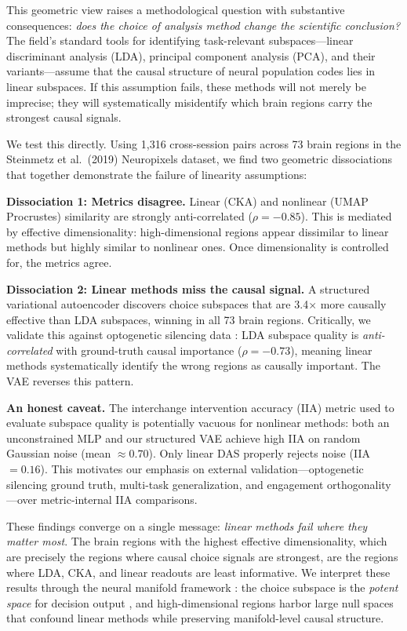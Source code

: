 \documentclass{article}
\begin{document}
This geometric view raises a methodological question with substantive consequences: \emph{does the choice of analysis method change the scientific conclusion?} The field's standard tools for identifying task-relevant subspaces---linear discriminant analysis (LDA), principal component analysis (PCA), and their variants---assume that the causal structure of neural population codes lies in linear subspaces. If this assumption fails, these methods will not merely be imprecise; they will systematically misidentify which brain regions carry the strongest causal signals.

We test this directly. Using 1,316 cross-session pairs across 73 brain regions in the Steinmetz et al.\ (2019) Neuropixels dataset, we find two geometric dissociations that together demonstrate the failure of linearity assumptions:

\textbf{Dissociation 1: Metrics disagree.} Linear (CKA) and nonlinear (UMAP Procrustes) similarity are strongly anti-correlated ($\rho = -0.85$). This is mediated by effective dimensionality: high-dimensional regions appear dissimilar to linear methods but highly similar to nonlinear ones. Once dimensionality is controlled for, the metrics agree.

\textbf{Dissociation 2: Linear methods miss the causal signal.} A structured variational autoencoder \citep{narayanaswamy2017learning} discovers choice subspaces that are 3.4$\times$ more causally effective than LDA subspaces, winning in all 73 brain regions. Critically, we validate this against optogenetic silencing data \citep{zatkahaas2021spatiotemporal}: LDA subspace quality is \emph{anti-correlated} with ground-truth causal importance ($\rho = -0.73$), meaning linear methods systematically identify the wrong regions as causally important. The VAE reverses this pattern.

\textbf{An honest caveat.} The interchange intervention accuracy (IIA) metric used to evaluate subspace quality is potentially vacuous for nonlinear methods: both an unconstrained MLP and our structured VAE achieve high IIA on random Gaussian noise (mean $\approx 0.70$). Only linear DAS properly rejects noise (IIA $= 0.16$). This motivates our emphasis on external validation---optogenetic silencing ground truth, multi-task generalization, and engagement orthogonality---over metric-internal IIA comparisons.

These findings converge on a single message: \emph{linear methods fail where they matter most}. The brain regions with the highest effective dimensionality, which are precisely the regions where causal choice signals are strongest, are the regions where LDA, CKA, and linear readouts are least informative. We interpret these results through the neural manifold framework \citep{gallego2017neural}: the choice subspace is the \emph{potent space} for decision output \citep{kaufman2014cortical}, and high-dimensional regions harbor large null spaces that confound linear methods while preserving manifold-level causal structure.
\end{document}
